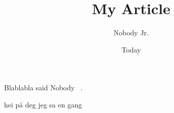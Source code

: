 \documentclass[11pt]{article}
\begin{document}
\title{My Article}
\author{Nobody Jr.}
\date{Today}
\maketitle

Blablabla said Nobody ~\cite{Nobody06}.

hei på deg jeg sa en gang ~\cite{mrx05}

{}

\end{document}
